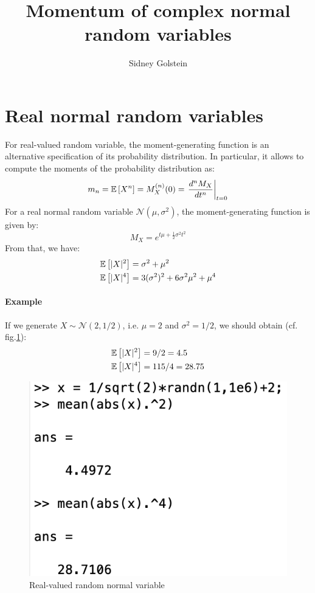 \documentclass[12pt]{article}
\begin{document}
\title{Momentum of complex normal  random variables}
\author{Sidney Golstein}
\maketitle


\section{Real normal random variables}
For real-valued random variable, the moment-generating function is an alternative specification of its probability distribution. In particular, it allows to compute the moments of the probability distribution as:
\begin{equation}
	m_n = \mathbb{E} \left[X^n\right] = M_X^{(n)}(0) = \left. \frac{d^n M_X}{dt^n}\right|_{t=0}
\end{equation}
For a real normal random variable $\mathcal{N}(\mu,\sigma^2) $, the moment-generating function is given by:
\begin{equation}
	M_X = e^{t \mu + \frac{1}{2} \sigma^2 t^2 }
\end{equation}
From that, we have:
\begin{equation}
	\begin{split}
		&\mathbb{E} \left[|X|^2\right] = \sigma^2 + \mu^2\\
		&\mathbb{E} \left[|X|^4\right] = 3(\sigma^2)^2 + 6 \sigma^2 \mu^2 + \mu^4
	\end{split}
\label{eq:moments_x}
\end{equation}

\paragraph*{Example}
If we generate $X \sim \mathcal{N}(2,1/2)$, i.e. $\mu = 2$ and $\sigma^2 = 1/2$, we should obtain (cf. fig.\ref{fig:ex_rv_x}):
\begin{equation}
\begin{split}
&\mathbb{E} \left[|X|^2\right] = 9/2 = 4.5\\
&\mathbb{E} \left[|X|^4\right] = 115/4 = 28.75
\end{split}
\label{eq:ex_x}
\end{equation}
\begin{figure}[htb!]
	\centering
	\includegraphics[width=.3\linewidth]{img/example_rv_x.png}
	\caption{Real-valued random normal variable}
	\label{fig:ex_rv_x}
\end{figure}
\end{document}
